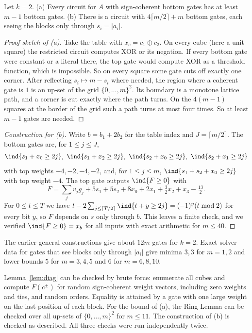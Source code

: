 \begin{proposition}\label{prop:k2}
Let $k=2$. (a) Every circuit for $A$ with sign-coherent bottom gates has at
least $m-1$ bottom gates. (b) There is a circuit with $4\lceil m/2\rceil+m$
bottom gates, each seeing the blocks only through $s_i=|a_i|$.
\end{proposition}
\begin{proof}[Proof sketch of (a)]
Take the table with $x_c=c_1\oplus c_2$. On every cube (here a unit square)
the restricted circuit computes XOR or its negation. If every bottom gate were
constant or a literal there, the top gate would compute XOR as a threshold
function, which is impossible. So on every square some gate cuts off exactly
one corner. After reflecting $s_i\mapsto m-s_i$ where needed, the region where
a coherent gate is $1$ is an up-set of the grid $\{0,\dots,m\}^2$. Its
boundary is a monotone lattice path, and a corner is cut exactly where the
path turns. On the $4(m-1)$ squares at the border of the grid such a path
turns at most four times. So at least $m-1$ gates are needed.
\end{proof}
\begin{proof}[Construction for (b)]
Write $b=b_1+2b_2$ for the table index and $J=\lceil m/2\rceil$. The bottom
gates are, for $1\le j\le J$,
\[
\ind{s_1+x_0\ge2j},\ \ind{s_1+x_2\ge2j},\ \ind{s_2+x_0\ge2j},\ \ind{s_2+x_1\ge2j}
\]
with top weights $-4,-2,-4,-2$, and, for $1\le j\le m$, $\ind{s_1+s_2+x_0\ge2j}$
with top weight $-4$. The top gate outputs $\ind{F\ge0}$ with
\[
F=\sum_j v_jg_j+5s_1+5s_2+8x_0+2x_1+\tfrac32x_2+x_3-\tfrac{13}2 .
\]
For $0\le t\le T$ we have $t-2\sum_{j\le\lceil T/2\rceil}\ind{t+y\ge2j}=(-1)^y(t\bmod2)$
for every bit $y$, so $F$ depends on $s$ only through $b$. This leaves a
finite check, and we verified $\ind{F\ge0}=x_b$ for all inputs with exact
arithmetic for $m\le40$.
\end{proof}

The earlier general constructions give about $12m$ gates for $k=2$. Exact
solver data for gates that see blocks only through $|a_i|$ give minima $3,3$
for $m=1,2$ and lower bounds $5$ for $m=3,4,5$ and $6$ for $m=6,8,10$.

Lemma~\ref{lem:diag} can be checked by brute force: enumerate all cubes and
compute $F(c^\pm)$ for random sign-coherent weight vectors, including zero
weights and ties, and random orders. Equality is attained by a gate with one
large weight on the last position of each block. For the bound of (a), the
Ring Lemma can be checked over all up-sets of $\{0,\dots,m\}^2$ for
$m\le11$. The construction of (b) is checked as described. All three checks
were run independently twice.
